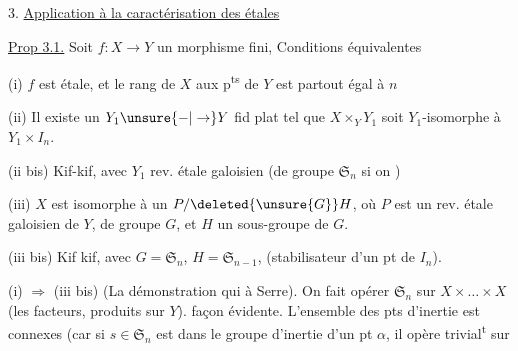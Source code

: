 3. \uline{Application à la caractérisation des   étales }  


\uline{Prop 3.1.} Soit $f:X\to Y$ un morphisme fini,  Conditions équivalentes

(i) $f$ est étale, et le rang de $X$ aux p\textsuperscript{ts} de $Y$ est partout égal à $n$

(ii) Il existe un $Y_1\unsure{-|\to}Y$ fid plat tel que $X\times_Y Y_1$ soit $Y_1$-isomorphe à $Y_1\times I_n$.

(ii bis) Kif-kif, avec $Y_1$  rev. étale galoisien (de groupe $\mathfrak S_n$ si on )

(iii) $X$ est isomorphe à un $P/\deleted{\unsure{G}}H$, où $P$ est un rev. étale galoisien de $Y$, de groupe $G$, et $H$ un sous-groupe de $G$.

(iii bis) Kif kif, avec $G=\mathfrak S_n$, $H=\mathfrak S_{n-1}$,  (stabilisateur d'un pt de $I_n$).


(i) $\Longrightarrow$ (iii bis) (La démonstration qui     à  Serre). On fait opérer $\mathfrak S_n$ sur $X\times\ldots\times X$ (les facteurs, produits sur $Y$). façon évidente. L'ensemble des pts d'inertie est   connexes (car si $s\in\mathfrak S_n$ est dans le groupe d'inertie d'un pt $\alpha$, il opère trivial\textsuperscript{t} sur


